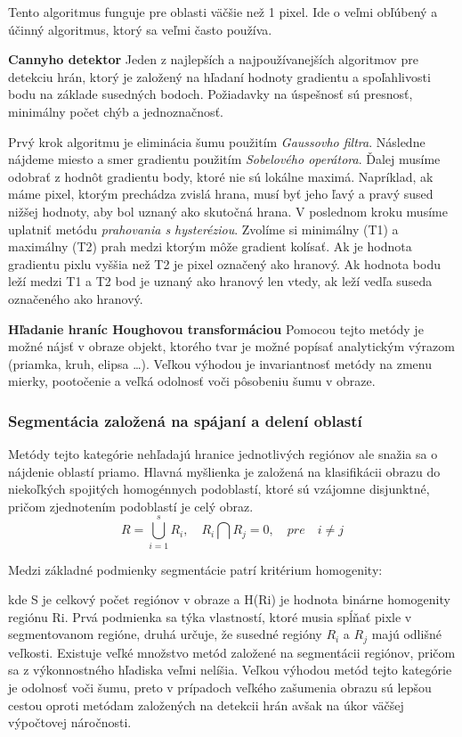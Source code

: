 Tento algoritmus funguje pre oblasti väčšie než 1 pixel.  Ide o veľmi obľúbený a účinný algoritmus, ktorý sa veľmi často používa.

\textbf{Cannyho detektor}
Jeden z najlepších a najpoužívanejších algoritmov pre detekciu hrán, ktorý je založený na hľadaní hodnoty gradientu a spoľahlivosti bodu na základe susedných bodoch. Požiadavky na úspešnosť sú presnosť, minimálny počet chýb a jednoznačnosť. 

Prvý krok algoritmu je eliminácia šumu použitím \textit{Gaussovho filtra}.  Následne nájdeme miesto a smer gradientu použitím \textit{Sobelového operátora}. Ďalej musíme odobrať z hodnôt gradientu  body, ktoré nie sú lokálne maximá. Napríklad, ak máme pixel, ktorým prechádza zvislá hrana, musí byť jeho ľavý a pravý sused nižšej hodnoty, aby bol uznaný  ako skutočná hrana. V poslednom kroku musíme uplatniť metódu \textit{prahovania s hysteréziou}. Zvolíme si minimálny (T1) a maximálny (T2) prah medzi ktorým môže gradient kolísať.  Ak je hodnota gradientu pixlu vyššia než T2 je pixel označený ako hranový. Ak hodnota bodu leží medzi T1 a T2 bod je uznaný ako hranový len vtedy, ak leží vedľa suseda označeného ako hranový.


\textbf{Hľadanie hraníc Houghovou transformáciou}
Pomocou tejto metódy je možné nájsť v obraze objekt, ktorého tvar je možné popísať analytickým výrazom (priamka, kruh, elipsa …). Veľkou výhodou je invariantnosť metódy na zmenu mierky, pootočenie a veľká odolnosť voči pôsobeniu šumu v obraze. 

\subsubsection{Segmentácia založená na spájaní a delení oblastí}
Metódy tejto kategórie nehľadajú hranice jednotlivých regiónov ale snažia sa o nájdenie oblastí priamo. Hlavná myšlienka je založená na klasifikácii obrazu do niekoľkých spojitých homogénnych podoblastí,  ktoré sú vzájomne disjunktné, pričom zjednotením podoblastí je celý obraz.
$$R=\bigcup_{i=1}^s R_i{,}\quad R_i\bigcap R_j=0{,}\quad{pre}\quad i\neq j$$

Medzi základné podmienky segmentácie patrí kritérium homogenity:


kde S je celkový počet regiónov v obraze a H(Ri) je hodnota binárne homogenity regiónu Ri. Prvá podmienka sa týka vlastností, ktoré musia spĺňať pixle v segmentovanom regióne, druhá určuje, že susedné regióny $R_i$ a $R_j$ majú odlišné veľkosti. Existuje veľké množstvo metód založené na segmentácii regiónov, pričom sa z výkonnostného hľadiska veľmi nelíšia. Veľkou výhodou metód tejto kategórie je odolnosť voči šumu, preto v prípadoch veľkého zašumenia obrazu sú lepšou cestou oproti metódam založených na detekcii hrán avšak na úkor väčšej výpočtovej náročnosti.  

